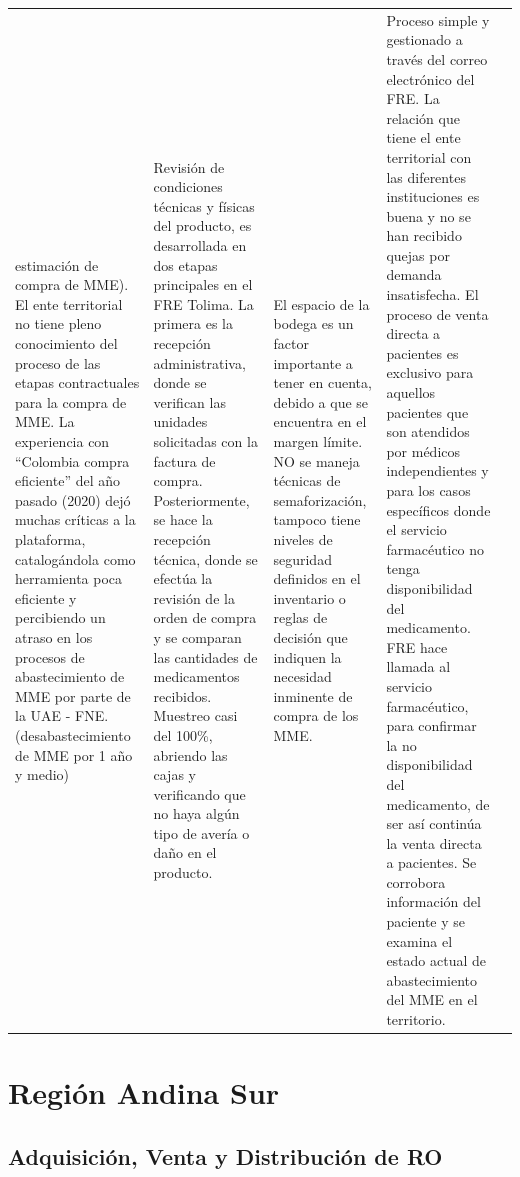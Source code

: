 \documentclass[
]{book}
\begin{document}
\begin{longtable}[t]{lllll}
estimación de compra de MME). El
ente territorial no tiene pleno
conocimiento del proceso de las
etapas contractuales para la
compra de MME. La experiencia con
“Colombia compra eficiente” del año
pasado (2020) dejó muchas críticas
a la plataforma, catalogándola
como herramienta poca eficiente
y percibiendo un atraso en los
procesos de abastecimiento de
MME por parte de la UAE - FNE.
(desabastecimiento de MME por 1 año
y medio) & Revisión de condiciones técnicas
y físicas del producto, es
desarrollada en dos etapas
principales en el FRE Tolima.
La primera es la recepción
administrativa, donde se verifican
las unidades solicitadas con la
factura de compra. Posteriormente,
se hace la recepción técnica,
donde se efectúa la revisión de
la orden de compra y se comparan
las cantidades de medicamentos
recibidos. Muestreo casi del 100\%,
abriendo las cajas y verificando
que no haya algún tipo de avería o
daño en el producto. & El espacio de la bodega es un
factor importante a tener en
cuenta, debido a que se encuentra
en el margen límite. NO se maneja
técnicas de semaforización,
tampoco tiene niveles de seguridad
definidos en el inventario o
reglas de decisión que indiquen la
necesidad inminente de compra de
los MME. & Proceso simple y gestionado a
través del correo electrónico
del FRE. La relación que tiene
el ente territorial con las
diferentes instituciones es buena
y no se han recibido quejas por
demanda insatisfecha. El proceso
de venta directa a pacientes
es exclusivo para aquellos
pacientes que son atendidos por
médicos independientes y para
los casos específicos donde el
servicio farmacéutico no tenga
disponibilidad del medicamento.
FRE hace llamada al servicio
farmacéutico, para confirmar la no
disponibilidad del medicamento, de
ser así continúa la venta directa a
pacientes. Se corrobora información
del paciente y se examina el estado
actual de abastecimiento del MME en
el territorio.\\*
\end{longtable}
\endgroup{}

\hypertarget{regiuxf3n-andina-sur}{%
\section{Región Andina Sur}\label{regiuxf3n-andina-sur}}

\hypertarget{adquisiciuxf3n-venta-y-distribuciuxf3n-de-ro-1}{%
\subsection{Adquisición, Venta y Distribución de RO}\label{adquisiciuxf3n-venta-y-distribuciuxf3n-de-ro-1}}
\end{document}

